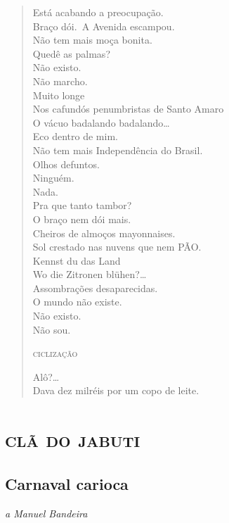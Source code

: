 \begin{verse}
Está acabando a preocupação.\\
Braço dói.\
A Avenida escampou.\\
Não tem mais moça bonita.\\
Quedê as palmas?\\
Não existo.\\
Não marcho.\\
Muito longe\\
Nos cafundós penumbristas de Santo Amaro\\
O vácuo badalando badalando\ldots{}\\
Eco dentro de mim.\\
Não tem mais Independência do Brasil.\\
Olhos defuntos.\\
Ninguém.\\
Nada.\\
Pra que tanto tambor?\\
O braço nem dói mais.\\
Cheiros de almoços mayonnaises.\\
Sol crestado nas nuvens que nem PÃO.\\
\qquad\qquad Kennst du das Land\\
\qquad\qquad Wo die Zitronen blühen?\ldots{}\\
\qquad\qquad\qquad\qquad  Assombrações desaparecidas.\\
\qquad\qquad\qquad\qquad\qquad  O mundo não existe.\\
\qquad\qquad\qquad\qquad\qquad\qquad Não existo.\\
\qquad\qquad\qquad\qquad\qquad\qquad Não sou.

\qquad\qquad\qquad\quad\textsc{ciclização}

\qquad\qquad\qquad\qquad\qquad Alô?\ldots{}\\
Dava dez milréis por um copo de leite.
\end{verse}

\paginabranca
\part{\textsc{clã do jabuti}}

\chapter[Carnaval carioca]{Carnaval carioca }

\hfill\emph{a Manuel Bandeira}

